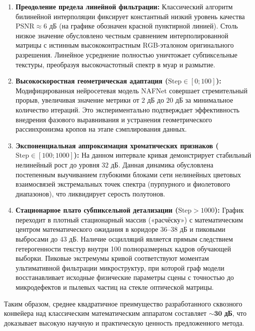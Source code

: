 \documentclass[12pt,a4paper]{article}
\begin{document}
\begin{enumerate}
    \item \textbf{Преодоление предела линейной фильтрации:} Классический алгоритм билинейной интерполяции фиксирует константный низкий уровень качества $\text{PSNR} \approx 6$ дБ (на графике обозначен красной пунктирной линией). Столь низкое значение обусловлено честным сравнением интерполированной матрицы с истинным высококонтрастным RGB-эталоном оригинального разрешения. Линейное усреднение полностью уничтожает субпиксельные текстуры, преобразуя высокочастотный спектр в муар и размытие.
    
    \item \textbf{Высокоскоростная геометрическая адаптация ($\text{Step} \in [0; 100]$):} Модифицированная нейросетевая модель NAFNet совершает стремительный прорыв, увеличивая значение метрики от $2$ дБ до $20$ дБ за минимальное количество итераций. Это экспериментально подтверждает эффективность внедрения фазового выравнивания и устранения геометрического рассинхронизма кропов на этапе сэмплирования данных.
    
    \item \textbf{Экспоненциальная аппроксимация хроматических признаков ($\text{Step} \in [100; 1000]$):} На данном интервале кривая демонстрирует стабильный нелинейный рост до уровня $32$ дБ. Данная динамика обусловлена постепенным выучиванием глубокими блоками сети нелинейных цветовых взаимосвязей экстремальных точек спектра (пурпурного и фиолетового диапазонов), что ликвидирует серость полутонов.
    
    \item \textbf{Стационарное плато субпиксельной детализации ($\text{Step} > 1000$):} График переходит в плотный стационарный массив («расчёску») с математическим центром математического ожидания в коридоре $36$–$38$ дБ и пиковыми выбросами до $43$ дБ. Наличие осцилляций является прямым следствием гетерогенности текстур внутри 100 полноразмерных кадров обучающей выборки. Пиковые экстремумы кривой соответствуют моментам ультимативной фильтрации микроструктур, при которой граф модели восстанавливает исходные физические параметры сцены с точностью до микродефектов и пылевых частиц на стекле оптической матрицы.
\end{enumerate}

Таким образом, среднее квадратичное преимущество разработанного сквозного конвейера над классическим математическим аппаратом составляет $\sim \mathbf{30}$ {\bf дБ}, что доказывает высокую научную и практическую ценность предложенного метода.
\end{document}
